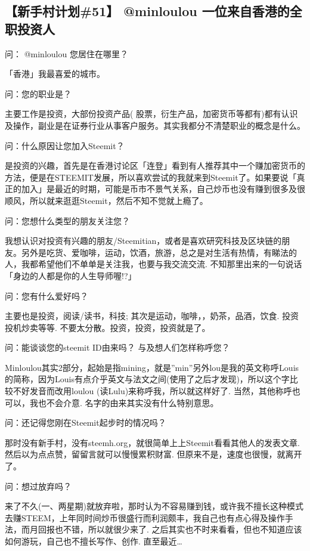 \documentclass[]{ctexbook}
\begin{document}
\hypertarget{51-minloulou-}{%
\subsection{【新手村计划\#51】 @minloulou 一位来自香港的全职投资人}\label{51-minloulou-}}

问： @minloulou 您居住在哪里？

「香港」我最喜爱的城市。

问：您的职业是？

主要工作是投资，大部份投资产品( 股票，衍生产品，加密货币等都有)都有认识及操作，副业是在证券行业从事客户服务。其实我都分不清楚职业的概念是什么。

问：什么原因让您加入Steemit？

是投资的兴趣，首先是在香港讨论区「连登」看到有人推荐其中一个赚加密货币的方法，便是在STEEMIT发展，所以喜欢尝试的我就来到Steemit了。如果要说「真正的加入」是最近的时期，可能是币市不景气关系，自己炒币也没有赚到很多及很顺风，所以就来逛逛Steemit，然后不知不觉就上瘾了。

问：您想什么类型的朋友关注您？

我想认识对投资有兴趣的朋友/Steemitian，或者是喜欢研究科技及区块链的朋友。另外是吃货、爱咖啡，运动，饮酒，旅游，总之是对生活有热情，有睇法的人，我都希望他们不单单是关注我，也要与我交流交流. 不知那里出来的一句说话 「身边的人都是你的人生导师喔!?」

问：您有什么爱好吗？

主要也是投资，阅读/读书，科技; 其次是运动，咖啡，，奶茶，品酒，饮食. 投资投机炒卖等等. 不要太分散。投资，投资，投资就是了。

问：能谈谈您的steemit ID由来吗？ 与及想人们怎样称呼您？

Minloulou其实2部分，起始是指mining，就是''min''另外lou是我的英文称呼Louis的简称，因为Louis有点介乎英文与法文之间(使用了之后才发现)，所以这个字比较不好发音而改用loulou (读Lulu)来称呼我，所以就这样好了. 当然，其他称呼也可以，我也不会介意. 名字的由来其实没有什么特别意思。

问：还记得您刚在Steemit起步时的情况吗？

那时没有新手村，没有steemh.org，就很简单上上Steemit看看其他人的发表文章. 然后以为点点赞，留留言就可以慢慢累积财富. 但原来不是，速度也很慢，就离开了。

问：想过放弃吗？

来了不久(一、两星期)就放弃啦，那时认为不容易赚到钱，或许我不擅长这种模式去赚STEEM，上年同时间炒币很盛行而利润颇丰，我自己也有点心得及操作手法，而月回报也不错，所以就很少来了. 之后其实也不时来看看，但也不知道应该如何游玩，自己也不擅长写作、创作. 直至最近\ldots{}
\end{document}
